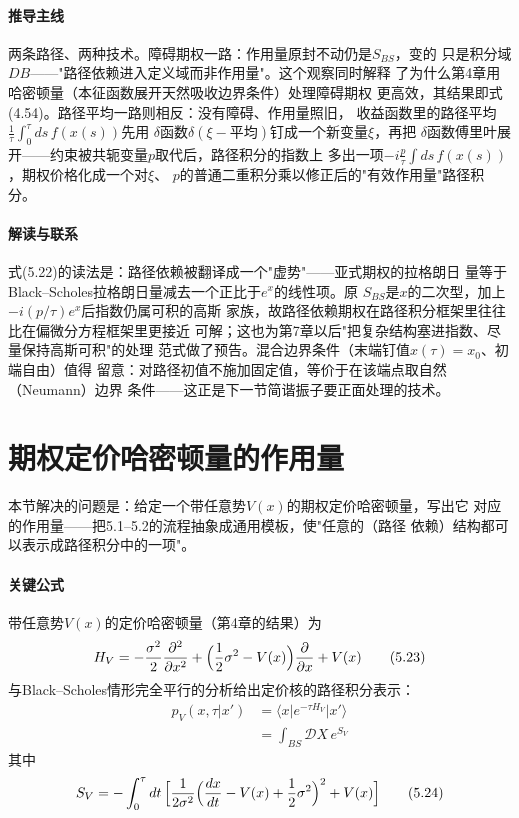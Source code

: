\paragraph{推导主线}
两条路径、两种技术。障碍期权一路：作用量原封不动仍是$S_{BS}$，变的
只是积分域$DB$——"路径依赖进入定义域而非作用量"。这个观察同时解释
了为什么第4章用哈密顿量（本征函数展开天然吸收边界条件）处理障碍期权
更高效，其结果即式(4.54)。路径平均一路则相反：没有障碍、作用量照旧，
收益函数里的路径平均$\frac{1}{\tau}\int_{0}^{\tau}ds\,f(x(s))$先用
$\delta$函数$\delta(\xi-\text{平均})$钉成一个新变量$\xi$，再把
$\delta$函数傅里叶展开——约束被共轭变量$p$取代后，路径积分的指数上
多出一项$-i\frac{p}{\tau}\int ds\,f(x(s))$，期权价格化成一个对$\xi$、
$p$的普通二重积分乘以修正后的"有效作用量"路径积分。

\paragraph{解读与联系}
式(5.22)的读法是：路径依赖被翻译成一个"虚势"——亚式期权的拉格朗日
量等于Black--Scholes拉格朗日量减去一个正比于$e^{x}$的线性项。原
$S_{BS}$是$x$的二次型，加上$-i(p/\tau)e^{x}$后指数仍属可积的高斯
家族，故路径依赖期权在路径积分框架里往往比在偏微分方程框架里更接近
可解；这也为第7章以后"把复杂结构塞进指数、尽量保持高斯可积"的处理
范式做了预告。混合边界条件（末端钉值$x(\tau)=x_{0}$、初端自由）值得
留意：对路径初值不施加固定值，等价于在该端点取自然（Neumann）边界
条件——这正是下一节简谐振子要正面处理的技术。

\section{期权定价哈密顿量的作用量}

本节解决的问题是：给定一个带任意势$V(x)$的期权定价哈密顿量，写出它
对应的作用量——把5.1--5.2的流程抽象成通用模板，使"任意的（路径
依赖）结构都可以表示成路径积分中的一项"。

\paragraph{关键公式}
带任意势$V(x)$的定价哈密顿量（第4章的结果）为
\begin{equation*}
H_{V}=-\frac{\sigma^{2}}{2}\frac{\partial^{2}}{\partial x^{2}}
+\Bigl(\frac{1}{2}\sigma^{2}-V(x)\Bigr)\frac{\partial}{\partial x}
+V(x)
\tag{5.23}
\end{equation*}
与Black--Scholes情形完全平行的分析给出定价核的路径积分表示：
\begin{align*}
p_{V}(x,\tau\vert x')&=\langle x\vert e^{-\tau H_{V}}\vert x'\rangle\\
&=\int_{BS}\mathcal{D}X\,e^{S_{V}}
\end{align*}
其中
\begin{equation*}
S_{V}=-\int_{0}^{\tau}dt\,
\Bigl[\frac{1}{2\sigma^{2}}\Bigl(\frac{dx}{dt}-V(x)+\frac{1}{2}\sigma^{2}\Bigr)^{2}
+V(x)\Bigr]
\tag{5.24}
\end{equation*}

